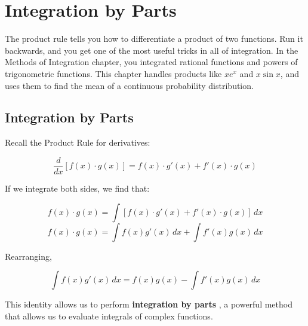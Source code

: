 \chapter{Integration by Parts}

The product rule tells you how to differentiate a product of two functions. Run it backwards, and you get one
of the most useful tricks in all of integration. In the Methods of Integration chapter, you integrated rational
functions and powers of trigonometric functions. This chapter handles products like $x e^x$ and $x \sin x$,
and uses them to find the mean of a continuous probability distribution.

\section{Integration by Parts}

Recall the Product Rule for derivatives:

$$\frac{d}{dx} \left[ f(x) \cdot g(x) \right] = f(x) \cdot g'(x) + f'(x) \cdot g(x)$$

If we integrate both sides, we find that:

$$f(x) \cdot g(x) = \int \left[ f(x) \cdot g'(x) + f'(x) \cdot g(x) \right]\,dx$$
$$f(x) \cdot g(x) = \int f(x)g'(x)\,dx + \int f'(x)g(x)\,dx$$

Rearranging, 

$$\int f(x)g'(x)\,dx = f(x)g(x) - \int f'(x)g(x)\,dx$$

This identity allows us to perform \textbf{integration by parts}
, a powerful method that allows us to evaluate 
integrals of complex functions. 

